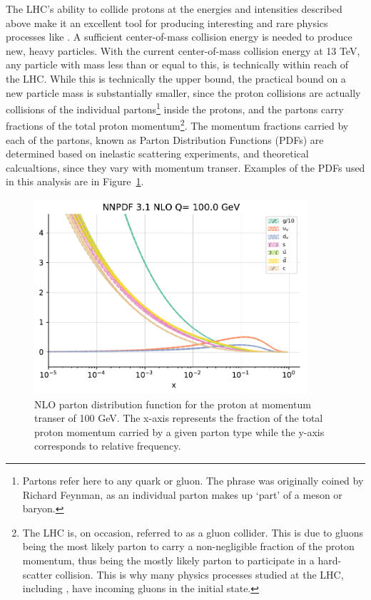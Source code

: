 The LHC's ability to collide protons at the energies and intensities described above make it an excellent tool for producing interesting
and rare physics processes like \tth.
A sufficient center-of-mass collision energy is needed to produce new, heavy particles.
With the current center-of-mass collision energy at 13 TeV, any particle with mass less than or equal to this, is 
technically within reach of the LHC. While this is technically the upper bound, the practical bound on a new particle mass is substantially smaller,
since the proton collisions are actually collisions of the individual partons\footnote{Partons refer here to any quark or gluon. The phrase was originally
coined by Richard Feynman, as an individual parton makes up `part' of a meson or baryon.} inside the protons, and the partons carry fractions of the total proton
momentum\footnote{The LHC is, on occasion, referred to as a gluon collider. This is due to gluons being the most likely parton to carry a non-negligible fraction of the proton momentum, thus
being the mostly likely parton to participate in a hard-scatter collision. This is why many physics processes studied at the LHC, including \tth, have incoming gluons in the initial state.}.
The momentum fractions carried by each of the partons, known as Parton Distribution Functions (PDFs) are determined based on inelastic scattering experiments, and theoretical calcualtions, since they
vary with momentum transer. Examples of the PDFs used in this analysis are in Figure~\ref{fig:nnpdf}. 

\begin{figure}[hbtp]
 \begin{center}
   \includegraphics[width=0.9\textwidth]{ch3_figs/nnpdf3p1_nlo_q100.pdf}
   \caption[NLO parton distribution function for the proton at Q = 100 GeV]{NLO parton distribution function for the proton at momentum transer of 100 GeV.
     The x-axis represents the fraction of the total proton momentum carried by a given parton type while the y-axis corresponds to relative
     frequency\cite{nnpdf3}.}
   \label{fig:nnpdf}
 \end{center}
\end{figure}

